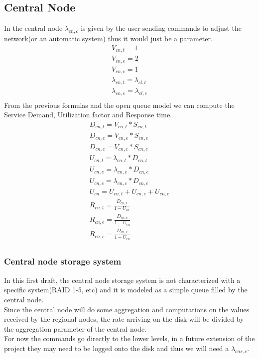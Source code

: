 \documentclass[11pt]{article}
\begin{document}
\subsection{Central Node}
In the central node $\lambda_{cn,c}$ is given by the user sending commands to adjust the network(or an automatic system) thus it would just be a parameter.
\begin{equation}
	\begin{array}{l}
		V_{cn, t} = 1 \\
		V_{cn, e} = 2 \\ %
		V_{cn,c} = 1 \\
		\lambda_{cn, t} = \lambda_{cl,t} \\
		\lambda_{cn, e} = \lambda_{cl,e} \\
	\end{array}
\end{equation}
From the previous formulas and the open queue model we can compute the Service Demand, Utilization factor and Response time.
\begin{equation}
	\begin{array}{l}
		D_{cn, t} = V_{cn, t} * S_{cn, t} \\
		D_{cn, e} = V_{cn, e} * S_{cn, e} \\
		D_{cn, c} = V_{cn, c} * S_{cn, c} \\
		U_{cn, t} = \lambda_{cn, t} * D_{cn, t} \\
		U_{cn, e} = \lambda_{cn, e} * D_{cn, e} \\
		U_{cn, c} = \lambda_{cn, c} * D_{cn, c} \\
		U_{cn} = U_{cn, t} + U_{cn, e} + U_{cn, c} \\
		R_{cn, t} = \frac{D_{cn, t}}{1 - U_{cn}} \\
		R_{cn, e} = \frac{D_{cn, e}}{1 - U_{cn}} \\
		R_{cn, c} = \frac{D_{cn, c}}{1 - U_{cn}} \\
	\end{array}
\end{equation}

\subsubsection{Central node storage system}
In this first draft, the central node storage system is not characterized with a specific system(RAID 1-5, etc) and it is modeled as a simple queue filled by the central node.\\
Since the central node will do some aggregation and computations on the values received by the regional nodes, the rate arriving on the disk will be divided by the aggregation parameter of the central node.\\
For now the commands go directly to the lower levels, in a future extension of the project they may need to be logged onto the disk and thus we will need a $\lambda_{cns, c}$.
\end{document}
